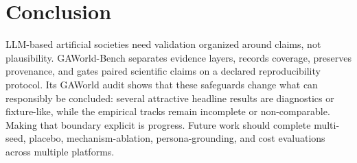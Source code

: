 \documentclass[letterpaper]{article}
\begin{document}
\section{Conclusion}

LLM-based artificial societies need validation organized around claims, not plausibility. GAWorld-Bench
separates evidence layers, records coverage, preserves provenance, and gates paired scientific claims on
a declared reproducibility protocol. Its GAWorld audit shows that these safeguards change what can
responsibly be concluded: several attractive headline results are diagnostics or fixture-like, while the empirical
tracks remain incomplete or non-comparable. Making that boundary explicit is progress. Future work should
complete multi-seed, placebo, mechanism-ablation, persona-grounding, and cost evaluations across
multiple platforms.


\end{document}
